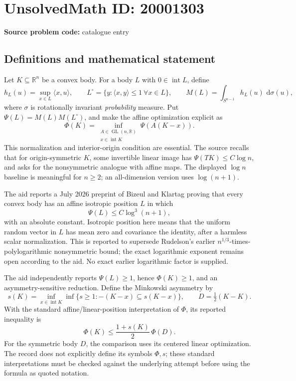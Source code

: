 \documentclass[11pt]{article}
\newcommand{\R}{\mathbb{R}}
\newcommand{\dd}{\,\mathrm{d}}
\begin{document}
\section*{UnsolvedMath ID: 20001303}
\textbf{Source problem code:} catalogue entry
\subsection{Definitions and mathematical statement}
Let \(K\subseteq\R^n\) be a convex body. For a body \(L\) with \(0\in\operatorname{int}L\), define
\[
 h_L(u)=\sup_{x\in L}\langle x,u\rangle,\qquad
 L^\circ=\{y:\langle x,y\rangle\leq1\ \forall x\in L\},\qquad
 M(L)=\int_{S^{n-1}}h_L(u)\,\dd\sigma(u),
\]
where \(\sigma\) is rotationally invariant \emph{probability} measure. Put \(\Psi(L)=M(L)M(L^\circ)\), and make the affine optimization explicit as
\[
 \Phi(K)=\inf_{\substack{A\in\operatorname{GL}(n,\R)\\x\in\operatorname{int}K}}
 \Psi(A(K-x)).
\]
This normalization and interior-origin condition are essential. The source recalls that for origin-symmetric \(K\), some invertible linear image has \(\Psi(TK)\leq C\log n\), and asks for the nonsymmetric analogue with affine maps. The displayed \(\log n\) baseline is meaningful for \(n\geq2\); an all-dimension version uses \(\log(n+1)\).

The aid reports a July 2026 preprint of Bizeul and Klartag proving that every convex body has an affine isotropic position \(L\) in which
\[
 \Psi(L)\leq C\log^3(n+1),
\]
with an absolute constant. Isotropic position here means that the uniform random vector in \(L\) has mean zero and covariance the identity, after a harmless scalar normalization. This is reported to supersede Rudelson's earlier \(n^{1/3}\)-times-polylogarithmic nonsymmetric bound; the exact logarithmic exponent remains open according to the aid. No exact earlier logarithmic factor is supplied.

The aid independently reports \(\Psi(L)\geq1\), hence \(\Phi(K)\geq1\), and an asymmetry-sensitive reduction. Define the Minkowski asymmetry by
\[
 s(K)=\inf_{x\in\operatorname{int}K}\inf\{s\geq1:-(K-x)\subseteq s(K-x)\},\qquad
 D=\tfrac12(K-K).
\]
With the standard affine/linear-position interpretation of \(\Phi\), its reported inequality is
\[
 \Phi(K)\leq\frac{1+s(K)}2\,\Phi(D).
\]
For the symmetric body \(D\), the comparison uses its centered linear optimization. The record does not explicitly define its symbols \(\Phi,s\); these standard interpretations must be checked against the underlying attempt before using the formula as quoted notation.
\end{document}
